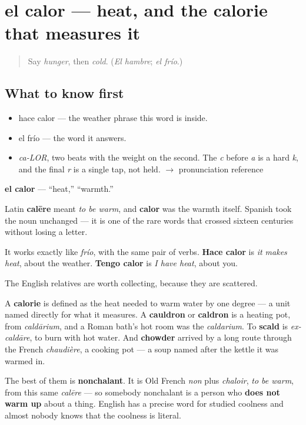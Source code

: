 \section[el calor]{el calor — heat, and the calorie that measures it}

\label{lesson:ES-C334-calor}



\begin{quote}
Say \emph{hunger}, then \emph{cold}. (\emph{El hambre}; \emph{el frío}.)
\end{quote}

\subsection*{What to know first}
\begin{itemize}
\raggedright
  \item hace calor — the weather phrase this word is inside.
  \item el frío — the word it answers.
\end{itemize}

\begin{sounds}
\begin{itemize}
\raggedright
  \item \emph{ca-LOR}, two beats with the weight on the second. The \emph{c} before \emph{a} is a hard \emph{k}, and the final \emph{r} is a single tap, not held. $\to$ pronunciation reference
\end{itemize}
\end{sounds}

\begin{cousinweb}
\textbf{el calor} — \textquotedblleft{}heat,\textquotedblright{} \textquotedblleft{}warmth.\textquotedblright{}

Latin \textbf{calēre} meant \emph{to be warm}, and \textbf{calor} was the warmth itself. Spanish took the noun unchanged — it is one of the rare words that crossed sixteen centuries without losing a letter.

It works exactly like \emph{frío}, with the same pair of verbs. \textbf{Hace calor} is \emph{it makes heat}, about the weather. \textbf{Tengo calor} is \emph{I have heat}, about you.

The English relatives are worth collecting, because they are scattered.

A \textbf{calorie} is defined as the heat needed to warm water by one degree — a unit named directly for what it measures. A \textbf{cauldron} or \textbf{caldron} is a heating pot, from \emph{caldārium}, and a Roman bath's hot room was the \emph{caldarium}. To \textbf{scald} is \emph{ex-caldāre}, to burn with hot water. And \textbf{chowder} arrived by a long route through the French \emph{chaudière}, a cooking pot — a soup named after the kettle it was warmed in.

The best of them is \textbf{nonchalant}. It is Old French \emph{non} plus \emph{chaloir}, \emph{to be warm}, from this same \emph{calēre} — so somebody nonchalant is a person who \textbf{does not warm up} about a thing. English has a precise word for studied coolness and almost nobody knows that the coolness is literal.
\end{cousinweb}

